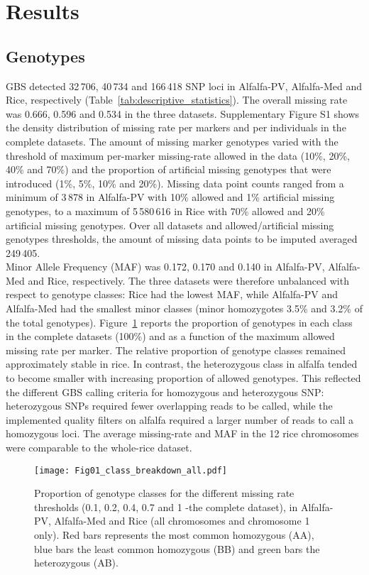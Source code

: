 \section{Results}
\label{sec:results}

\subsection{Genotypes}
\label{sec:genotypes}  
GBS detected 32\,706, 40\,734 and 166\,418 SNP loci in Alfalfa-PV, Alfalfa-Med and Rice, respectively (Table~\ref{tab:descriptive_statistics}). The overall missing rate was 0.666, 0.596 and 0.534 in the three datasets. Supplementary Figure S1 shows the density distribution of missing rate per markers and per individuals in the complete datasets. The amount of missing marker genotypes varied with the threshold of maximum per-marker missing-rate allowed in the data (10\%, 20\%, 40\% and 70\%) and the proportion of artificial missing genotypes that were introduced (1\%, 5\%, 10\% and 20\%). Missing data point counts ranged from a minimum of 3\,878 in Alfalfa-PV with 10\% allowed and 1\% artificial missing genotypes, to a maximum of 5\,580\,616 in Rice with 70\% allowed and 20\% artificial missing genotypes. Over all datasets and allowed/artificial missing genotypes thresholds, the amount of missing data points to be imputed averaged 249\,405.\\
Minor Allele Frequency (MAF) was 0.172, 0.170 and 0.140 in Alfalfa-PV, Alfalfa-Med and Rice, respectively. The three datasets were therefore unbalanced with respect to genotype classes: Rice had the lowest MAF, while Alfalfa-PV and Alfalfa-Med had the smallest minor classes (minor homozygotes 3.5\% and 3.2\% of the total genotypes). Figure~\ref{fig:genotype_classes} reports the proportion of genotypes in each class in the complete datasets (100\%) and as a function of the maximum allowed missing rate per marker. The relative proportion of genotype classes remained approximately stable in rice. In contrast, the heterozygous class in alfalfa tended to become smaller with increasing proportion of allowed genotypes. This reflected the different GBS calling criteria for homozygous and heterozygous SNP: heterozygous SNPs required fewer overlapping reads to be called, while the implemented quality filters on alfalfa required a larger number of reads to call a homozygous loci. The average missing-rate and MAF in the 12 rice chromosomes were comparable to the whole-rice dataset.

\begin{figure}
\texttt{[image: Fig01\_class\_breakdown\_all.pdf]}
\caption[Proportions of genotype classes]{​Proportion of genotype classes for the different missing rate thresholds (0.1, 0.2, 0.4, 0.7 and 1 -the complete dataset), in Alfalfa-PV, Alfalfa-Med and Rice (all chromosomes and chromosome 1 only). Red bars represents the most common homozygous (AA), blue bars the least common homozygous (BB) and green bars the heterozygous (AB).}
\label{fig:genotype_classes}
\end{figure}

